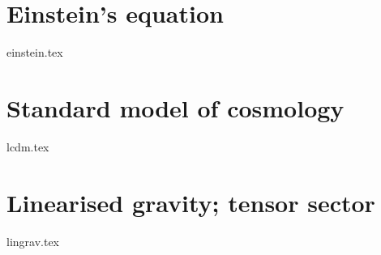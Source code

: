 \section{Einstein's equation}\label{sec:GR:einstein}
{{einstein.tex}}


\section{Standard model of cosmology}\label{sec:GR:lcdm}
{{lcdm.tex}}


\section{Linearised gravity; tensor sector}\label{sec:GR:lingrav}
{{lingrav.tex}}











\clearpage
\newpage
